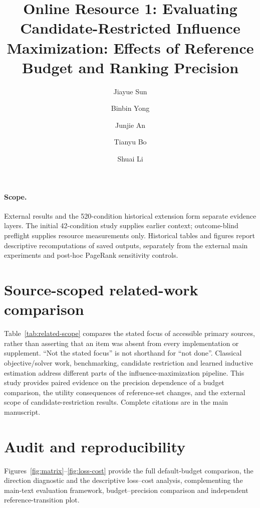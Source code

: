 \documentclass[smallextended]{svjour3}
\begin{document}
\title{Online Resource 1: Evaluating Candidate-Restricted Influence Maximization: Effects of Reference Budget and Ranking Precision}
\author{Jiayue Sun \and Binbin Yong \and Junjie An \and Tianyu Bo \and Shuai Li}
\date{}\maketitle
\paragraph{Scope.} External results and the 520-condition historical extension form separate evidence layers. The initial 42-condition study supplies earlier context; outcome-blind preflight supplies resource measurements only. Historical tables and figures report descriptive recomputations of saved outputs, separately from the external main experiments and post-hoc PageRank sensitivity controls.

\section{Source-scoped related-work comparison}
Table~\ref{tab:related-scope} compares the stated focus of accessible primary
sources, rather than asserting that an item was absent from every implementation
or supplement. ``Not the stated focus'' is not shorthand for ``not done''.
Classical objective/solver work, benchmarking, candidate restriction and learned
inductive estimation address different parts of the influence-maximization
pipeline. This study provides paired evidence on the precision dependence of a
budget comparison, the utility consequences of reference-set changes, and the
external scope of candidate-restriction results. Complete citations are in the
main manuscript.


\section{Audit and reproducibility}
Figures~\ref{fig:matrix}--\ref{fig:loss-cost} provide the full default-budget
comparison, the direction diagnostic and the descriptive loss--cost analysis,
complementing the main-text evaluation framework, budget--precision comparison
and independent reference-transition plot.
\end{document}
